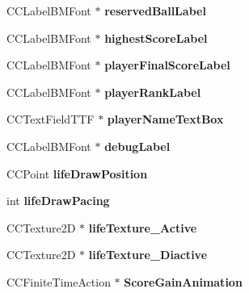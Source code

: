 \begin{DoxyCompactItemize}
\item 
\hypertarget{class_j_g___game___g_u_i_ae88bbd163193cef29f94673d4845eb6e}{C\-C\-Label\-B\-M\-Font $\ast$ {\bfseries reserved\-Ball\-Label}}\label{class_j_g___game___g_u_i_ae88bbd163193cef29f94673d4845eb6e}

\item 
\hypertarget{class_j_g___game___g_u_i_af9213ca3a5f5c427971e54ab32c5cf43}{C\-C\-Label\-B\-M\-Font $\ast$ {\bfseries highest\-Score\-Label}}\label{class_j_g___game___g_u_i_af9213ca3a5f5c427971e54ab32c5cf43}

\item 
\hypertarget{class_j_g___game___g_u_i_a86b1a5c05686a9173208d9a609339ebd}{C\-C\-Label\-B\-M\-Font $\ast$ {\bfseries player\-Final\-Score\-Label}}\label{class_j_g___game___g_u_i_a86b1a5c05686a9173208d9a609339ebd}

\item 
\hypertarget{class_j_g___game___g_u_i_a033275d4174f6f61d5dcbf17920e875f}{C\-C\-Label\-B\-M\-Font $\ast$ {\bfseries player\-Rank\-Label}}\label{class_j_g___game___g_u_i_a033275d4174f6f61d5dcbf17920e875f}

\item 
\hypertarget{class_j_g___game___g_u_i_ac88e0f0c5ab46ab45f28a2562ed06722}{C\-C\-Text\-Field\-T\-T\-F $\ast$ {\bfseries player\-Name\-Text\-Box}}\label{class_j_g___game___g_u_i_ac88e0f0c5ab46ab45f28a2562ed06722}

\item 
\hypertarget{class_j_g___game___g_u_i_a5fc5adc75e567a55869c196844cf073b}{C\-C\-Label\-B\-M\-Font $\ast$ {\bfseries debug\-Label}}\label{class_j_g___game___g_u_i_a5fc5adc75e567a55869c196844cf073b}

\item 
\hypertarget{class_j_g___game___g_u_i_a886cd9bd4a12da25e1f05ca9e1a501ce}{C\-C\-Point {\bfseries life\-Draw\-Position}}\label{class_j_g___game___g_u_i_a886cd9bd4a12da25e1f05ca9e1a501ce}

\item 
\hypertarget{class_j_g___game___g_u_i_a69435a812e22fa55dce2f24f2312ee2c}{int {\bfseries life\-Draw\-Pacing}}\label{class_j_g___game___g_u_i_a69435a812e22fa55dce2f24f2312ee2c}

\item 
\hypertarget{class_j_g___game___g_u_i_a77dac1b5580d1d1476a73a2ae954e1ec}{C\-C\-Texture2\-D $\ast$ {\bfseries life\-Texture\-\_\-\-Active}}\label{class_j_g___game___g_u_i_a77dac1b5580d1d1476a73a2ae954e1ec}

\item 
\hypertarget{class_j_g___game___g_u_i_a9d5b10e0006ec907f28bf56b24445108}{C\-C\-Texture2\-D $\ast$ {\bfseries life\-Texture\-\_\-\-Diactive}}\label{class_j_g___game___g_u_i_a9d5b10e0006ec907f28bf56b24445108}

\item 
\hypertarget{class_j_g___game___g_u_i_afea3a0ffb12113d009ed39c1bedd2727}{C\-C\-Finite\-Time\-Action $\ast$ {\bfseries Score\-Gain\-Animation}}\label{class_j_g___game___g_u_i_afea3a0ffb12113d009ed39c1bedd2727}

\end{DoxyCompactItemize}


